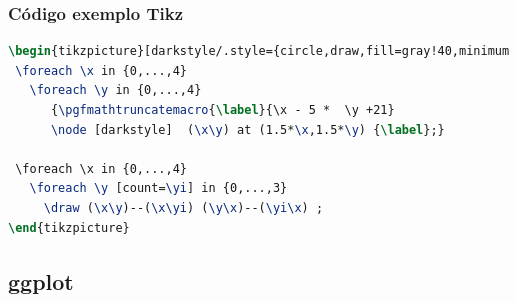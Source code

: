 \begin{frame}[fragile]
\frametitle{Código exemplo Tikz}
\begin{lstlisting}[language=tex, label=lst-tikz, caption={Código utilizado para criar o exemplo em tikz.}, postbreak=\mbox{$\hookrightarrow$\space}, basicstyle=\fontsize{8}{10}\selectfont\ttfamily]
\begin{tikzpicture}[darkstyle/.style={circle,draw,fill=gray!40,minimum size=20}]
 \foreach \x in {0,...,4}
   \foreach \y in {0,...,4} 
      {\pgfmathtruncatemacro{\label}{\x - 5 *  \y +21}
      \node [darkstyle]  (\x\y) at (1.5*\x,1.5*\y) {\label};} 

 \foreach \x in {0,...,4}
   \foreach \y [count=\yi] in {0,...,3}  
     \draw (\x\y)--(\x\yi) (\y\x)--(\yi\x) ;
\end{tikzpicture}
\end{lstlisting}
\end{frame}


\subsection{ggplot}

